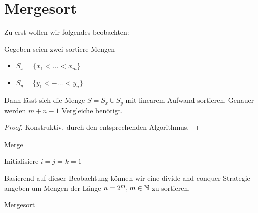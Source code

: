 \section{Mergesort}
Zu erst wollen wir folgendes beobachten:
\begin{lemma}
	Gegeben seien zwei sortiere Mengen
	\begin{itemize}
		\item $S_x=\{x_1<\ldots<x_m\}$
		\item $S_y=\{y_1<-\ldots<y_n\}$
	\end{itemize}
Dann lässt sich die Menge $S=S_x \cup S_y$ mit linearem Aufwand sortieren. Genauer werden $m+n-1$ Vergleiche benötigt.			
\end{lemma}
\begin{proof}
Konstruktiv, durch den entsprechenden Algorithmus.
\end{proof}
\begin{algorithm}[H]
\label{alg:merge}
\caption{Merge}
Initialisiere $i=j=k=1$ \\
\end{algorithm}
Basierend auf dieser Beobachtung können wir eine divide-and-conquer Strategie angeben um Mengen der Länge $n=2^{m}, m \in  \mathbb{N}$ zu sortieren. \\
\begin{algorithm}[H]
	\label{alg:mergesort}
	\caption{Mergesort}
\end{algorithm}
